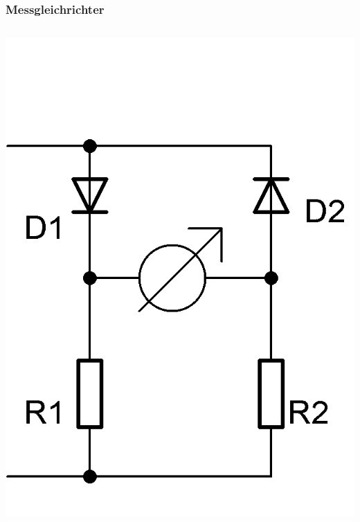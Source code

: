 \begin{frame}
  \frametitle{Messgleichrichter}
  \begin{columns}
    \begin{center}
      \includegraphics[width=\textwidth,height=.4\textheight,keepaspectratio]{a16/Messgleichrichter1.png}\\

\end{center}
\end{columns}
\end{frame}
